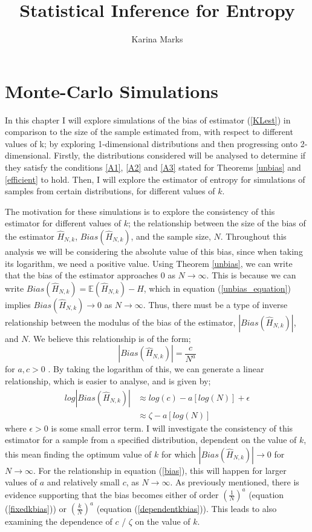 \documentclass{report}
\title{Statistical Inference for Entropy}
\author{Karina Marks}
\begin{document}
\chapter{Monte-Carlo Simulations}

In this chapter I will explore simulations of the bias of estimator (\ref{KLest}) in comparison to the size of the sample estimated from, with respect to different values of k; by exploring 1-dimensional distributions and then progressing onto 2-dimensional. Firstly, the distributions considered will be analysed to determine if they satisfy the conditions \ref{A1}, \ref{A2} and \ref{A3} stated for Theorems \ref{unbias} and \ref{efficient} to hold. Then, I will explore the estimator of entropy for simulations of samples from certain distributions, for different values of $k$.

The motivation for these simulations is to explore the consistency of this estimator for different values of $k$; the relationship between the size of the bias of the estimator $\hat{H}_{N, k}$, $Bias(\hat{H}_{N, k})$,  and the sample size, $N$. Throughout this analysis we will be considering the absolute value of this bias, since when taking its logarithm, we need a positive value. Using Theorem \ref{unbias}, we can write that the bias of the estimator approaches 0 as $N \to \infty$. This is because we can write $Bias(\hat{H}_{N, k} ) = \mathbb{E}(\hat{H}_{N, k}) - H$, which in equation (\ref{unbias_equation}) implies $Bias(\hat{H}_{N, k}) \to 0$ as $N \to \infty$. Thus, there must be a type of inverse relationship between the modulus of the bias of the estimator, $|Bias(\hat{H}_{N, k})|$, and $N$. We believe this relationship is of the form;
\begin{equation} \label{bias}
|Bias(\hat{H}_{N, k})| = \frac{c}{N^a}
\end{equation}
for $a, c > 0$ \cite{paper3, paper4}. By taking the logarithm of this, we can generate a linear relationship, which is easier to analyse, and is given by;
\begin{align} 
log|Bias(\hat{H}_{N, k})| &\approx log(c) - a [log(N)] + \epsilon \nonumber \\
&\approx \zeta - a [log(N)] \label{logbias}
\end{align}
where $\epsilon > 0$ is some small error term. I will investigate the consistency of this estimator for a sample from a specified distribution, dependent on the value of $k$, this mean finding the optimum value of $k$ for which $|Bias(\hat{H}_{N, k})| \to 0$ for $N \to \infty$. For the relationship in equation (\ref{bias}), this will happen for larger values of $a$ and relatively small $c$, as $N \to \infty$. As previously mentioned, there is evidence supporting that the bias becomes either of order $(\frac{1}{N})^a$ (equation (\ref{fixedkbias})) or $(\frac{k}{N})^a$ (equation (\ref{dependentkbias})). This leads to also examining the dependence of $c$ / $\zeta$ on the value of $k$. 
\end{document}
